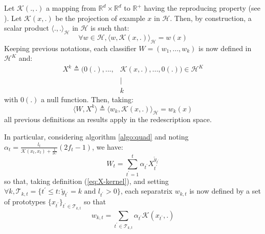 \documentclass[preprint,12pt,authoryear]{elsarticle}
\begin{document}
Let $\mathcal{K}(.,.)$ a mapping from $ \mathbb{R}^d \times \mathbb{R}^d$ to $ \mathbb{R}^+$ having the reproducing property (see \cite{scholkopf2002learning}). Let $\mathcal{K}(x,.)$ be the projection of example $x$ in $\mathcal{H}$. Then, by construction, a scalar product $\langle.,.\rangle_\mathcal{H}$ in $\mathcal{H}$ is such that: 
 $$\forall w \in \mathcal{H}, \langle w,\mathcal{K}(x,.)\rangle_\mathcal{H} = w(x) $$
Keeping previous notations, each classifier $W = (w_1,...,w_k)$ is now defined in $\mathcal{H}^K$ and:
 \begin{align}\label{eq:X-kernel}
 X^k \triangleq (0(.), ..., & \mathcal{K}(x,.), ..., 0(.)) \in \mathcal{H}^{K}\\
 &\mid\nonumber\\
 &k\nonumber
 \end{align}
with $0(.)$ a null function. Then, taking:
$$\langle W,X^k\rangle \triangleq \langle w_k,\mathcal{K}(x,.)\rangle_\mathcal{H} = w_k(x)$$
all previous definitions an results apply in the redescription space.



In particular, considering algorithm \ref{algo:quad} and noting $\alpha_t = \frac {l_{t}}{\mathcal{K}(x_{t},x_{t})+\frac{1}{2C}} (2f_{t} - 1)$, we have:
$$W_t = \sum_{t^\prime = 1} ^t \alpha_{t^\prime} X_{t^\prime}^{\tilde{y}_{t^\prime}} 
$$
so that, taking definition (\ref{eq:X-kernel}), and setting $\forall k, \mathcal{T}_{k,t} = \{{t^{\prime}} \leq t: \tilde{y}_{t^{\prime}} = k \text{ and } l_{t^{\prime}} > 0\}$, each 
separatrix $w_{k,t}$ is now defined by a set of prototypes 
$\{x_{t^{\prime}}\}_{{t^{\prime}}\in \mathcal{T}_{k,t}}$ 
so that 
	$$w_{k,t} = \sum_{t^{\prime}\in \mathcal{T}_{k,t}} \alpha_{t^{\prime}} \mathcal{K}(x_{t^{\prime}},.)$$
\end{document}
